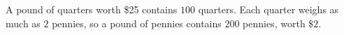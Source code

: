 A pound of quarters worth \$25 contains $100$ quarters. Each quarter weighs as much as $2$ pennies, so a pound of pennies contains $200$ pennies, worth $\boxed{\$2}$.
